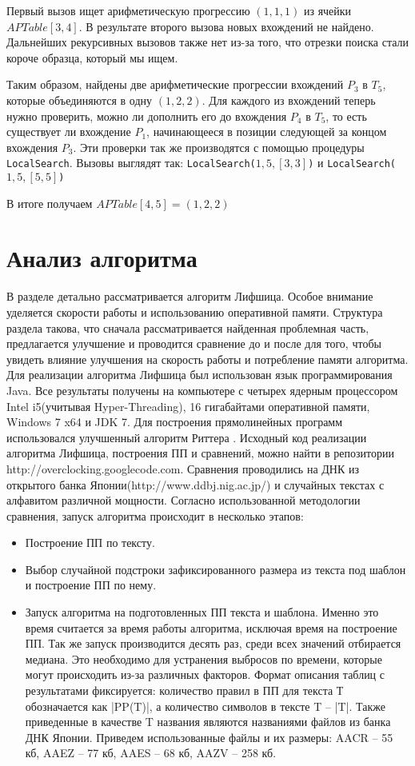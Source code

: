 \documentclass[14pt]{article}
\begin{document}
Первый вызов ищет арифметическую прогрессию $(1, 1, 1)$ из ячейки $APTable[3, 4]$. В результате второго вызова новых вхождений не найдено.
Дальнейших рекурсивных вызовов также нет из-за того, что отрезки поиска стали короче образца, который мы ищем.

Таким образом, найдены две арифметические прогрессии вхождений $P_3$ в $T_5$, которые объединяются в одну $(1, 2, 2)$.
Для каждого из вхождений теперь нужно проверить, можно ли дополнить его до вхождения $P_4$ в $T_5$, то есть существует ли вхождение $P_1$, начинающееся в позиции следующей за концом вхождения $P_3$.
Эти проверки так же производятся с помощью процедуры \texttt{LocalSearch}. Вызовы выглядят так:
\texttt{LocalSearch($1, 5, [3, 3]$)} и \texttt{LocalSearch($1, 5, [5, 5]$)}

В итоге получаем $APTable[4, 5] = (1, 2, 2)$

\newpage
\section{Анализ алгоритма}

В разделе детально рассматривается алгоритм Лифшица. Особое внимание уделяется скорости работы и использованию оперативной памяти. Структура раздела такова, что сначала рассматривается найденная проблемная часть, предлагается улучшение и проводится сравнение до и после для того, чтобы увидеть влияние улучшения на скорость работы и потребление памяти алгоритма. Для реализации алгоритма Лифшица был использован язык программирования Java. Все результаты получены на компьютере с четырех ядерным процессором Intel i5(учитывая Hyper-Threading), 16 гигабайтами оперативной памяти, Windows 7 x64 и JDK 7. Для построения прямолинейных программ использовался улучшенный алгоритм Риттера \cite{ModernRytterAlgorithm}. Исходный код реализации алгоритма Лифшица, построения ПП и сравнений, можно найти в репозитории http://overclocking.googlecode.com. Сравнения проводились на ДНК из открытого банка Японии(http://www.ddbj.nig.ac.jp/) и случайных текстах с алфавитом различной мощности.
Согласно использованной методологии сравнения, запуск алгоритма происходит в несколько этапов:
\begin{itemize}
\item Построение ПП по тексту.
\item Выбор случайной подстроки зафиксированного размера из текста под шаблон и построение ПП по нему.
\item Запуск алгоритма на подготовленных ПП текста и шаблона. Именно это время считается за время работы алгоритма, исключая время на построение ПП. Так же запуск производится десять раз, среди всех значений отбирается медиана. Это необходимо для устранения выбросов по времени, которые могут происходить из-за различных факторов. Формат описания таблиц с результатами фиксируется: количество правил в ПП для текста Т обозначается как |PP(T)|, а количество символов в тексте T -- |T|. Также приведенные в качестве T названия являются названиями файлов из банка ДНК Японии. Приведем использованные файлы и их размеры: AACR -- 55 кб, AAEZ -- 77 кб, AAES -- 68 кб, AAZV -- 258 кб. 

\end{itemize}
\end{document}

